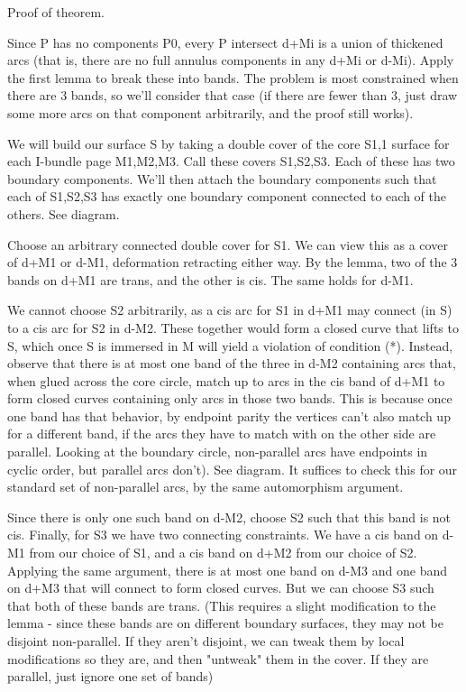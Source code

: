 \documentclass[12pt]{amsart}
\theoremstyle{definition}
\begin{document}
Proof of theorem.

Since P has no components P0, every P intersect d+Mi is a union of thickened
arcs (that is, there are no full annulus components in any d+Mi or d-Mi). Apply
the first lemma to break these into bands. The problem is most constrained when
there are 3 bands, so we'll consider that case (if there are fewer than 3, just
draw some more arcs on that component arbitrarily, and the proof still works).

We will build our surface S by taking a double cover of the core S1,1 surface
for each I-bundle page M1,M2,M3. Call these covers S1,S2,S3. Each of these has
two boundary components. We'll then attach the boundary components such that
each of S1,S2,S3 has exactly one boundary component connected to each of the
others.  See diagram.

Choose an arbitrary connected double cover for S1. We can view this as a cover
of d+M1 or d-M1, deformation retracting either way. By the lemma, two of the
3 bands on d+M1 are trans, and the other is cis. The same holds for d-M1.

We cannot choose S2 arbitrarily, as a cis arc for S1 in d+M1 may connect (in S)
to a cis arc for S2 in d-M2. These together would form a closed curve that
lifts to S, which once S is immersed in M will yield a violation of condition
(*). Instead, observe that there is at most one band of the three in d-M2
containing arcs that, when glued across the core circle, match up to arcs in
the cis band of d+M1 to form closed curves containing only arcs in those two
bands. This is because once one band has that behavior, by endpoint parity the
vertices can't also match up for a different band, if the arcs they have to
match with on the other side are parallel. Looking at the boundary circle,
non-parallel arcs have endpoints in cyclic order, but parallel arcs don't). See
diagram. It suffices to check this for our standard set of non-parallel arcs,
by the same automorphism argument.

Since there is only one such band on d-M2, choose S2 such that this band is not
cis.  Finally, for S3 we have two connecting constraints. We have a cis band on
d-M1 from our choice of S1, and a cis band on d+M2 from our choice of S2.
Applying the same argument, there is at most one band on d-M3 and one band on
d+M3 that will connect to form closed curves. But we can choose S3 such that
both of these bands are trans. (This requires a slight modification to the
lemma - since these bands are on different boundary surfaces, they may not be
disjoint non-parallel. If they aren't disjoint, we can tweak them by local
modifications so they are, and then "untweak" them in the cover. If they are
parallel, just ignore one set of bands)
\end{document}
